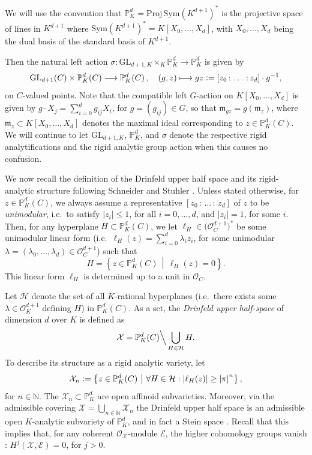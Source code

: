 \documentclass[a4paper, reqno, 10pt]{amsart}
\theoremstyle{definition}
\numberwithin{equation}{section}
\newcommand{\abs}[1]{{\lvert{#1}\rvert}}
\newcommand{\defeq}{\vcentcolon=}
\newcommand{\GL}{{\mathrm{GL}}}
\newcommand{\lra}{\longrightarrow}
\newcommand{\lto}{\longmapsto}
\newcommand{\Proj}{{\mathrm{Proj}}}
\newcommand{\ra}{\rightarrow}
\let\originalmiddle\middle
\renewcommand{\middle}[1]{\,\originalmiddle#1\,}
\newcommand{\BN}{{\mathbb {N}}}
\newcommand{\BP}{{\mathbb {P}}}
\newcommand{\CE}{{\mathcal {E}}}
\newcommand{\CH}{{\mathcal {H}}}
\newcommand{\CO}{{\mathcal {O}}}
\newcommand{\CX}{{\mathcal {X}}}
\newcommand{\Fm}{{\mathfrak {m}}}
\newcommand{\unif}{{\pi}}
\begin{document}
We will use the convention that 
$\BP^d_K = \Proj\, \mathrm{Sym} (K^{d+1})^{\ast}$ is the projective space of lines in $K^{d+1}$ where $\mathrm{Sym}(K^{d+1})^\ast = K[X_0,\ldots,X_d]$, 
with $X_0,\ldots,X_d$ being the dual basis of the standard basis of $K^{d+1}$.


Then the natural left action $\sigma \colon \GL_{d+1,K} \times_K \BP_K^d \ra \BP_K^d $ is given by
\begin{align*}
	\GL_{d+1}(C) \times \BP^d_K(C) \lra \BP^d_K(C) \,,\quad (g,z) \lto gz \defeq [z_0{\,:\,}\ldots{\,:\,}z_d]\cdot g^{-1} ,
\end{align*}
on $C$-valued points.
Note that the compatible left $G$-action on $K[X_0,\ldots,X_d]$ is given by $g\cdot X_j = \sum_{i=0}^d g_{ij} X_i$, for $g=(g_{ij}) \in G$, so that $\Fm_{gz} = g(\Fm_{z})$, where $\Fm_z \subset K[X_0,\ldots,X_d]$ denotes the maximal ideal corresponding to $z \in \BP_K^d(C)$.
We will continue to let $\GL_{d+1,K}$, $\BP_K^d$, and $\sigma$ denote the respective rigid analytifications and the rigid analytic group action when this causes no confusion.


We now recall the definition of the Drinfeld upper half space and its rigid-analytic structure following Schneider and Stuhler \cite[\S 1]{SchneiderStuhler91CohompAdicSymSp}.
Unless stated otherwise, for $z \in \BP^d_K(C)$, we always assume a representative $[z_0{\,:\,}\ldots{\,:\,}z_d]$ of $z$ to be \textit{unimodular}, i.e.\ to satisfy $\abs{z_i} \leq 1$, for all $i=0,\ldots,d$, and $\abs{z_i} = 1$, for some $i$.
Then, for any hyperplane $H \subset \BP^d_K(C)$, we let $\ell_H \in \big(\CO_C^{d+1}\big)^{\ast}$ be some unimodular linear form (i.e.\ $\ell_H (z) = \sum_{i=0}^d \lambda_i z_i$, for some unimodular $\lambda = (\lambda_0,\ldots,\lambda_d) \in \CO_C^{d+1}$) such that
\[H = \left\{z \in \BP^d_K(C) \middle{|} \ell_H(z) = 0 \right\} .\]
This linear form $\ell_H$ is determined up to a unit in $\CO_C$.



Let $\CH$ denote the set of all $K$-rational hyperplanes (i.e.\ there exists some  $\lambda \in \CO_K^{d+1}$ defining $H$) in $\BP^d_K(C)$.
As a set, the \textit{Drinfeld upper half-space} of dimension $d$ over $K$ is defined as 
\[\CX = \BP^d_K(C) \Big\backslash \bigcup_{H \in \CH} H .\]
To describe its structure as a rigid analytic variety, let
\[\CX_n \defeq \left\{ z \in \BP_K^d(C) \middle{|} \forall H \in \CH: \abs{\ell_H(z)} \geq \abs{\unif}^n \right\} ,\]
for $n\in \BN$.
The $\CX_n \subset \BP_K^d$ are open affinoid subvarieties.
Moreover, via the admissible covering $\CX = \bigcup_{n \in \BN} \CX_n$ the Drinfeld upper half space is an admissible open $K$-analytic subvariety of $\BP_K^d$, and in fact a Stein space \cite[\S 1, Prop.\ 4]{SchneiderStuhler91CohompAdicSymSp}.
Recall that this implies that, for any coherent $\CO_\CX$-module $\CE$, the higher cohomology groups vanish \cite[Satz 2.4]{Kiehl67ThmAundBNichtArchFunktTh}: $H^j(\CX,\CE) = 0$, for $j>0$.
\end{document}
